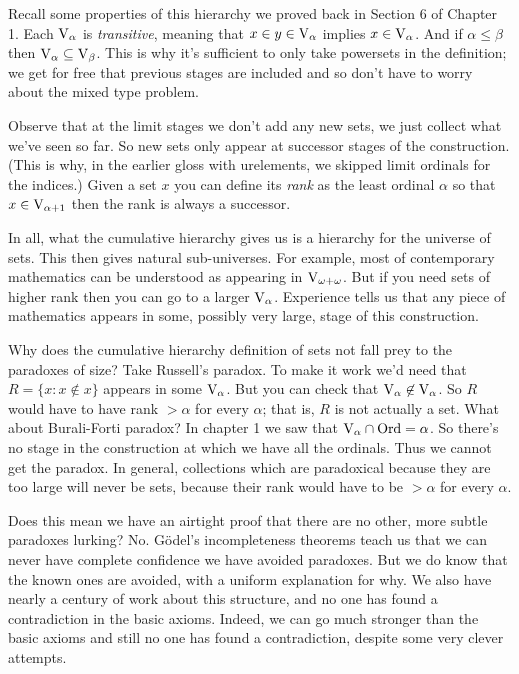 \documentclass[10pt]{amsart}
\begin{document}
Recall some properties of this hierarchy we proved back in Section 6 of Chapter 1. Each $\mathrm{V}_\alpha$ is \emph{transitive}, meaning that $x \in y \in \mathrm{V}_\alpha$ implies $x \in \mathrm{V}_\alpha$. And if $\alpha \le \beta$ then $\mathrm{V}_\alpha \subseteq \mathrm{V}_\beta$. This is why it's sufficient to only take powersets in the definition; we get for free that previous stages are included and so don't have to worry about the mixed type problem. 

Observe that at the limit stages we don't add any new sets, we just collect what we've seen so far. So new sets only appear at successor stages of the construction. (This is why, in the earlier gloss with urelements, we skipped limit ordinals for the indices.) Given a set $x$ you can define its \emph{rank} as the least ordinal $\alpha$ so that $x \in \mathrm{V}_{\alpha+1}$ then the rank is always a successor. 

In all, what the cumulative hierarchy gives us is a hierarchy for the universe of sets. This then gives natural sub-universes. For example, most of contemporary mathematics can be understood as appearing in $\mathrm{V}_{\omega + \omega}$. But if you need sets of higher rank then you can go to a larger $\mathrm{V}_\alpha$. Experience tells us that any piece of mathematics appears in some, possibly very large, stage of this construction.

Why does the cumulative hierarchy definition of sets not fall prey to the paradoxes of size? Take Russell's paradox. To make it work we'd need that $R = \{ x : x \not \in x \}$ appears in some $\mathrm{V}_\alpha$. But you can check that $\mathrm{V}_\alpha \not \in \mathrm{V}_\alpha$. So $R$ would have to have rank $> \alpha$ for every $\alpha$; that is, $R$ is not actually a set.
What about Burali-Forti paradox? In chapter 1 we saw that $\mathrm{V}_\alpha \cap \mathrm{Ord} = \alpha$. So there's no stage in the construction at which we have all the ordinals. Thus we cannot get the paradox. In general, collections which are paradoxical because they are too large will never be sets, because their rank would have to be $>\alpha$ for every $\alpha$.

Does this mean we have an airtight proof that there are no other, more subtle paradoxes lurking? No. G\"odel's incompleteness theorems teach us that we can never have complete confidence we have avoided paradoxes. But we do know that the known ones are avoided, with a uniform explanation for why. We also have nearly a century of work about this structure, and no one has found a contradiction in the basic axioms. Indeed, we can go much stronger than the basic axioms and still no one has found a contradiction, despite some very clever attempts. 
\end{document}
